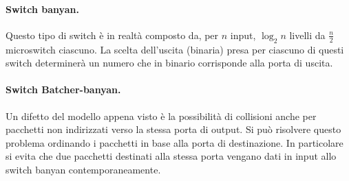             \paragraph{Switch banyan.} Questo tipo di switch è in realtà composto da, per $n$ input, $\log_2n$ livelli da $\frac{n}{2}$ microswitch ciascuno. La scelta dell'uscita (binaria) presa per ciascuno di questi switch determinerà un numero che in binario corrisponde alla porta di uscita.
            
            \paragraph{Switch Batcher-banyan.} Un difetto del modello appena visto è la possibilità di collisioni anche per pacchetti non indirizzati verso la stessa porta di output. Si può risolvere questo problema ordinando i pacchetti in base alla porta di destinazione. In particolare si evita che due pacchetti destinati alla stessa porta vengano dati in input allo switch banyan contemporaneamente.